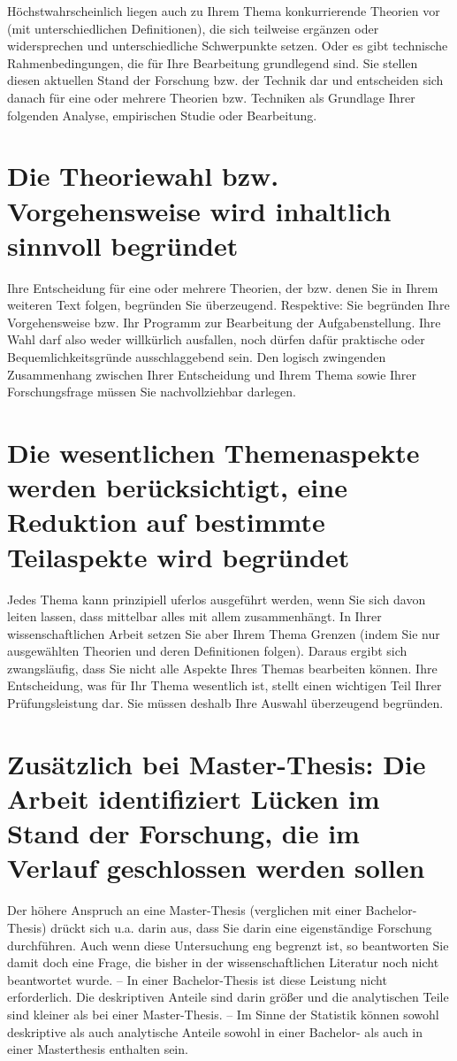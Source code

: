 Höchstwahrscheinlich liegen auch zu Ihrem Thema konkurrierende Theorien vor (mit unterschiedlichen Definitionen), die sich teilweise ergänzen oder widersprechen und unterschiedliche Schwerpunkte setzen. Oder es gibt technische Rahmenbedingungen, die für Ihre Bearbeitung grundlegend sind. Sie stellen diesen aktuellen Stand der Forschung bzw. der Technik dar und entscheiden sich danach für eine oder mehrere Theorien bzw. Techniken als Grundlage Ihrer folgenden Analyse, empirischen Studie oder Bearbeitung.

\section{Die Theoriewahl bzw. Vorgehensweise wird inhaltlich sinnvoll begründet}
\label{sec:theoriewahl-begruendung}

Ihre Entscheidung für eine oder mehrere Theorien, der bzw. denen Sie in Ihrem weiteren Text folgen, begründen Sie überzeugend. Respektive: Sie begründen Ihre Vorgehensweise bzw. Ihr Programm zur Bearbeitung der Aufgabenstellung. Ihre Wahl darf also weder willkürlich ausfallen, noch dürfen dafür praktische oder Bequemlichkeitsgründe ausschlaggebend sein. Den logisch zwingenden Zusammenhang zwischen Ihrer Entscheidung und Ihrem Thema sowie Ihrer Forschungsfrage müssen Sie nachvollziehbar darlegen.

\section{Die wesentlichen Themenaspekte werden berücksichtigt, eine Reduktion auf bestimmte Teilaspekte wird begründet}
\label{sec:themenaspekte-begruendung}

Jedes Thema kann prinzipiell uferlos ausgeführt werden, wenn Sie sich davon leiten lassen, dass mittelbar alles mit allem zusammenhängt. In Ihrer wissenschaftlichen Arbeit setzen Sie aber Ihrem Thema Grenzen (indem Sie nur ausgewählten Theorien und deren Definitionen folgen). Daraus ergibt sich zwangsläufig, dass Sie nicht alle Aspekte Ihres Themas bearbeiten können. Ihre Entscheidung, was für Ihr Thema wesentlich ist, stellt einen wichtigen Teil Ihrer Prüfungsleistung dar. Sie müssen deshalb Ihre Auswahl überzeugend begründen.

\section{Zusätzlich bei Master-Thesis: Die Arbeit identifiziert Lücken im Stand der Forschung, die im Verlauf geschlossen werden sollen}
\label{sec:masterthesis-forschungsluecken}

Der höhere Anspruch an eine Master-Thesis (verglichen mit einer Bachelor-Thesis) drückt sich u.a. darin aus, dass Sie darin eine eigenständige Forschung durchführen. Auch wenn diese Untersuchung eng begrenzt ist, so beantworten Sie damit doch eine Frage, die bisher in der wissenschaftlichen Literatur noch nicht beantwortet wurde. – In einer Bachelor-Thesis ist diese Leistung nicht erforderlich. Die deskriptiven Anteile sind darin größer und die analytischen Teile sind kleiner als bei einer Master-Thesis. – Im Sinne der Statistik können sowohl deskriptive als auch analytische Anteile sowohl in einer Bachelor- als auch in einer Masterthesis enthalten sein.